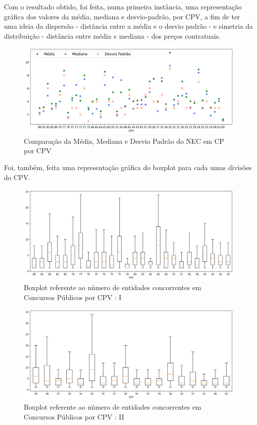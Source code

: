 Com o resultado obtido, foi feita, numa primeira instância, uma representação gráfica dos valores da média, mediana e desvio-padrão, por CPV, a fim de ter uma ideia da dispersão - distância entre a média e o desvio padrão - e simetria da distribuição - distância entre média e mediana - dos preços contratuais.

\begin{figure}[!htbp]
	\centering
	\includegraphics[width=\textwidth]{imagens/mmdp.png}
	\caption{Comparação da Média, Mediana e Desvio Padrão do NEC em CP por CPV}
	\label{}
\end{figure}

Foi, também, feita uma representação gráfica do boxplot para cada umas divisões do CPV. 

\begin{figure}[!htbp]
	\centering
	\includegraphics[width=.9\textwidth]{imagens/cpv1.png}
	\caption{Boxplot referente ao número de entidades concorrentes em Concursos Públicos por CPV : I}
	\label{}
\end{figure}


\begin{figure}[h!]
	\centering
	\includegraphics[width=.9\textwidth]{imagens/cpv2.png}
	\caption{Boxplot referente ao número de entidades concorrentes em Concursos Públicos por CPV : II}
	\label{}
\end{figure}


